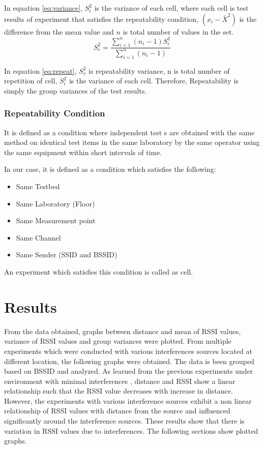 \documentclass[11pt,a4paper,headinclude,footinclude,chapterprefix=on]{scrreprt}
\begin{document}
In equation \ref{eq:variance}, $S_{i}^{2}$ is the variance of each cell, where each cell is test results of experiment that satisfies the repeatability condition, $(x_{i} - \bar{X}^2)$ is the difference from the mean value and $n$ is total number of values in the set. 
\begin{equation}
	\label{eq:repeat} {S}_r^2 = \frac{\sum\limits_{i=1}^{n} (n_{i} - 1){S}_i^2} {\sum\limits_{i=1}^{n}(n_{i} - 1)} 
\end{equation}

In equation \ref{eq:repeat}, ${S}_r^2$ is repeatability variance, n is total number of repetition of cell, $S_{i}^{2}$ is the variance of each cell. Therefore, Repeatability is simply the group variances of the test results.

\subsection{Repeatability Condition} It is defined as a condition where independent test s are obtained with the same method on identical test items in the same laboratory by the same operator using the same equipment within short intervals of time.

In our case, it is defined as a condition which satisfies the following: 
\begin{itemize}
	\item Same Testbed 
	\item Same Laboratory (Floor) 
	\item Same Measurement point 
	\item Same Channel 
	\item Same Sender (SSID and BSSID) 
\end{itemize}

An experiment which satisfies this condition is called as cell. 

\chapter{Results} From the data obtained, graphs between distance and mean of RSSI values, variance of RSSI values and group variances were plotted. From multiple experiments which were conducted with various interferences sources located at different location, the following graphs were obtained. The data is been grouped based on BSSID and analyzed. As learned from the previous experiments under environment with minimal interferences \cite{ref:rssi}, distance and RSSI show a linear relationship such that the RSSI value decreases with increase in distance. However, the experiments with various interference sources exhibit a non linear relationship of RSSI values with distance from the source and influenced significantly around the interference sources. These results show that there is variation in RSSI values due to interferences. The following sections show plotted graphs.
\end{document}
